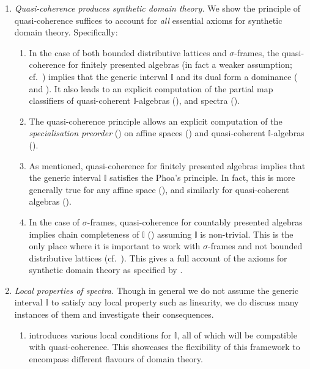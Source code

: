 \documentclass[a4paper,12pt]{amsart}
\theoremstyle{definition}
\newcommand{\mbb}[1]{\mathbb{#1}}
\newcommand{\I}{\mbb I}
\begin{document}
\begin{enumerate}[leftmargin=*]
  \item \emph{Quasi-coherence produces synthetic domain theory.} We show the principle of quasi-coherence suffices to account for \emph{all} essential axioms for synthetic domain theory. Specifically:
  \begin{enumerate}
    \item\label{contribution:dominance} In the case of both bounded distributive lattices and $\sigma$-frames, the quasi-coherence for finitely presented algebras (in fact a weaker assumption; cf.\ ) implies that the generic interval $\I$ and its dual form a dominance ( and ). It also leads to an explicit computation of the partial map classifiers of quasi-coherent $\I$-algebras (), and spectra ().
    \item The quasi-coherence principle allows an explicit computation of the \emph{specialisation preorder} () on affine spaces () and quasi-coherent $\I$-algebras ().
    \item As mentioned, quasi-coherence for finitely presented algebras implies that the generic interval $\I$ satisfies the Phoa's principle. In fact, this is more generally true for any affine space (), and similarly for quasi-coherent algebras ().
    \item In the case of $\sigma$-frames, quasi-coherence for countably presented algebras implies chain completeness of $\I$ () assuming $\I$ is non-trivial. 
    This is the only place where it is important to work with $\sigma$-frames and not bounded distributive lattices (cf.~). This gives a full account of the axioms for synthetic domain theory as specified by \citet{hyland1990first}. 
  \end{enumerate}

  \item \emph{Local properties of spectra.} Though in general we do not assume the generic interval $\I$ to satisfy any local property such as linearity, we do discuss many instances of them and investigate their consequences.
  \begin{enumerate}

    \item {} introduces various local conditions for $\I$, all of which will be compatible with quasi-coherence. This showcases the flexibility of this framework to encompass different flavours of domain theory.


\end{enumerate}
\end{enumerate}
\end{document}
